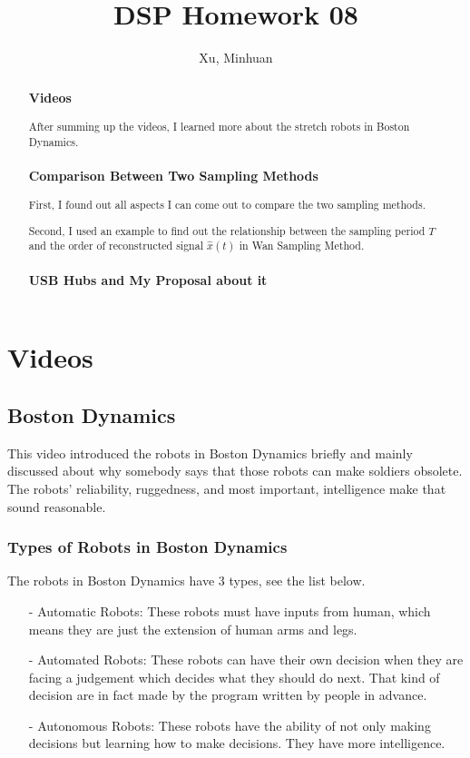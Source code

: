 \documentclass{article}
\begin{document}
\title{DSP Homework 08}
\author{Xu, Minhuan}
\maketitle
\tableofcontents
\begin{abstract}
\subsubsection*{Videos}
After summing up the videos, I learned more about the stretch robots in Boston Dynamics.
\subsubsection*{Comparison Between Two Sampling Methods}
First, I found out all aspects I can come out to compare the two sampling methods.

Second, I used an example to find out the relationship between the sampling period $T$ and the order of reconstructed signal $\hat{x}(t)$ in Wan Sampling Method.
\subsubsection*{USB Hubs and My Proposal about it}


\end{abstract}

\section{Videos}
\subsection{Boston Dynamics}
This video introduced the robots in Boston Dynamics briefly and mainly discussed about why somebody says that those robots can make soldiers obsolete. The robots' reliability, ruggedness, and most important, intelligence make that sound reasonable.

\subsubsection{Types of Robots in Boston Dynamics}

The robots in Boston Dynamics have 3 types, see the list below.
\begin{enumerate}
	\item[-] Automatic Robots: These robots must have inputs from human, which means they are just the extension of human arms and legs.
	\item[-] Automated Robots: These robots can have their own decision when they are facing a judgement which decides what they should do next. That kind of decision are in fact made by the program written by people in advance.
	\item[-] Autonomous Robots: These robots have the ability of not only making decisions but learning how to make decisions. They have more intelligence.
\end{enumerate}
\end{document}
